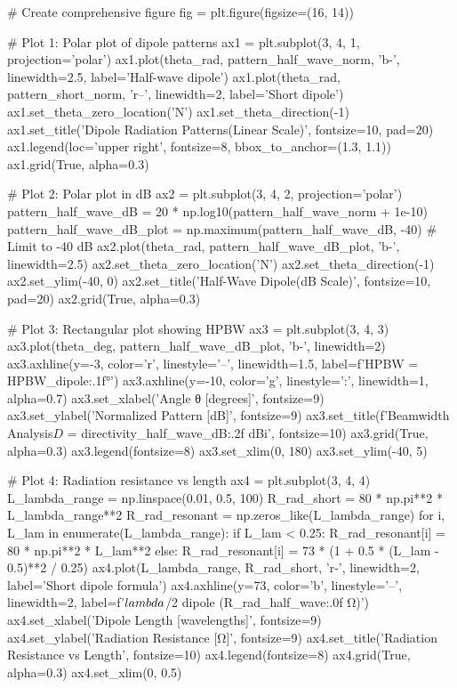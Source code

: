 \documentclass[a4paper, 11pt]{article}
\begin{document}
\begin{pycode}
# Create comprehensive figure
fig = plt.figure(figsize=(16, 14))

# Plot 1: Polar plot of dipole patterns
ax1 = plt.subplot(3, 4, 1, projection='polar')
ax1.plot(theta_rad, pattern_half_wave_norm, 'b-', linewidth=2.5, label='Half-wave dipole')
ax1.plot(theta_rad, pattern_short_norm, 'r--', linewidth=2, label='Short dipole')
ax1.set_theta_zero_location('N')
ax1.set_theta_direction(-1)
ax1.set_title('Dipole Radiation Patterns\n(Linear Scale)', fontsize=10, pad=20)
ax1.legend(loc='upper right', fontsize=8, bbox_to_anchor=(1.3, 1.1))
ax1.grid(True, alpha=0.3)

# Plot 2: Polar plot in dB
ax2 = plt.subplot(3, 4, 2, projection='polar')
pattern_half_wave_dB = 20 * np.log10(pattern_half_wave_norm + 1e-10)
pattern_half_wave_dB_plot = np.maximum(pattern_half_wave_dB, -40)  # Limit to -40 dB
ax2.plot(theta_rad, pattern_half_wave_dB_plot, 'b-', linewidth=2.5)
ax2.set_theta_zero_location('N')
ax2.set_theta_direction(-1)
ax2.set_ylim(-40, 0)
ax2.set_title('Half-Wave Dipole\n(dB Scale)', fontsize=10, pad=20)
ax2.grid(True, alpha=0.3)

# Plot 3: Rectangular plot showing HPBW
ax3 = plt.subplot(3, 4, 3)
ax3.plot(theta_deg, pattern_half_wave_dB_plot, 'b-', linewidth=2)
ax3.axhline(y=-3, color='r', linestyle='--', linewidth=1.5, label=f'HPBW = {HPBW_dipole:.1f}°')
ax3.axhline(y=-10, color='g', linestyle=':', linewidth=1, alpha=0.7)
ax3.set_xlabel('Angle θ [degrees]', fontsize=9)
ax3.set_ylabel('Normalized Pattern [dB]', fontsize=9)
ax3.set_title(f'Beamwidth Analysis\n$D$ = {directivity_half_wave_dB:.2f} dBi', fontsize=10)
ax3.grid(True, alpha=0.3)
ax3.legend(fontsize=8)
ax3.set_xlim(0, 180)
ax3.set_ylim(-40, 5)

# Plot 4: Radiation resistance vs length
ax4 = plt.subplot(3, 4, 4)
L_lambda_range = np.linspace(0.01, 0.5, 100)
R_rad_short = 80 * np.pi**2 * L_lambda_range**2
R_rad_resonant = np.zeros_like(L_lambda_range)
for i, L_lam in enumerate(L_lambda_range):
    if L_lam < 0.25:
        R_rad_resonant[i] = 80 * np.pi**2 * L_lam**2
    else:
        R_rad_resonant[i] = 73 * (1 + 0.5 * (L_lam - 0.5)**2 / 0.25)
ax4.plot(L_lambda_range, R_rad_short, 'r-', linewidth=2, label='Short dipole formula')
ax4.axhline(y=73, color='b', linestyle='--', linewidth=2, label=f'$\\lambda$/2 dipole ({R_rad_half_wave:.0f} Ω)')
ax4.set_xlabel('Dipole Length [wavelengths]', fontsize=9)
ax4.set_ylabel('Radiation Resistance [Ω]', fontsize=9)
ax4.set_title('Radiation Resistance vs Length', fontsize=10)
ax4.legend(fontsize=8)
ax4.grid(True, alpha=0.3)
ax4.set_xlim(0, 0.5)


\end{pycode}
\end{document}
